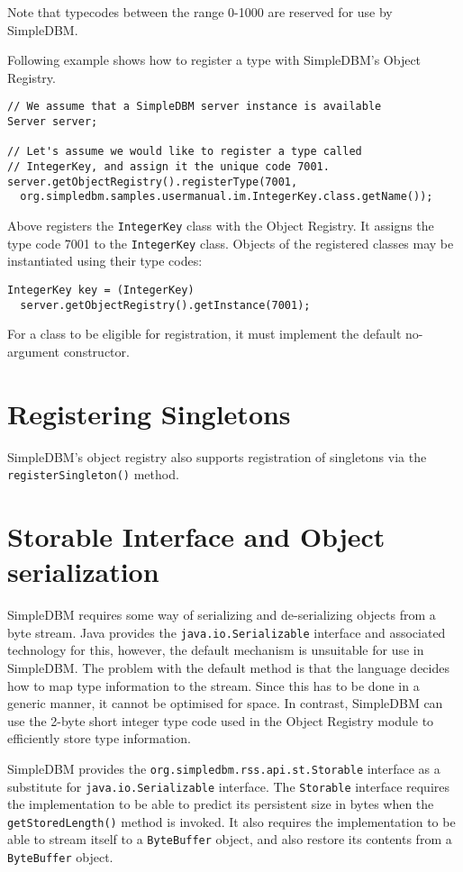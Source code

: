 \documentclass[a4paper,draft,oneside]{book}
\begin{document}
Note that typecodes between the range 0-1000 are reserved for use by
SimpleDBM.

Following example shows how to register a type with SimpleDBM's Object
Registry.

\begin{verbatim}
// We assume that a SimpleDBM server instance is available
Server server;		

// Let's assume we would like to register a type called
// IntegerKey, and assign it the unique code 7001. 
server.getObjectRegistry().registerType(7001,
  org.simpledbm.samples.usermanual.im.IntegerKey.class.getName());
\end{verbatim}

Above registers the \verb|IntegerKey| class with the Object Registry. It
assigns the type code 7001 to the \verb|IntegerKey| class. Objects of the
registered classes may be instantiated using their type codes:

\begin{verbatim}
IntegerKey key = (IntegerKey) 
  server.getObjectRegistry().getInstance(7001);
\end{verbatim}

For a class to be eligible for registration, it must implement the
default no-argument constructor.

\section{Registering Singletons}
SimpleDBM's object registry also supports registration of
singletons via the \verb|registerSingleton()| method. 

\section{Storable Interface and Object serialization}
SimpleDBM requires some way of serializing and de-serializing
objects from a byte stream. Java provides the \verb|java.io.Serializable|
interface and associated technology for this, however, the default
mechanism is unsuitable for use in SimpleDBM. The problem with the
default method is that the language decides how to map type
information to the stream. Since this has to be done in a generic
manner, it cannot be optimised for space. In contrast, SimpleDBM can
use the 2-byte short integer type code used in the Object Registry
module to efficiently store type information.

SimpleDBM provides the \verb|org.simpledbm.rss.api.st.Storable|
interface as a substitute for \verb|java.io.Serializable| interface. The
\verb|Storable| interface requires the implementation to be able to predict
its persistent size in bytes when the \verb|getStoredLength()| method is invoked. It
also requires the implementation to be able to stream itself to a
\verb|ByteBuffer| object, and also restore its contents from a
\verb|ByteBuffer| object.
\end{document}

